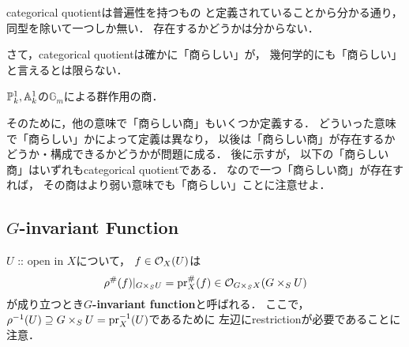\documentclass[a4paper]{jsarticle}
\newcommand{\Gm}{\mathbb{G}_m}
\begin{document}
    \begin{Remark}
        categorical quotientは普遍性を持つもの
        と定義されていることから分かる通り，
        同型を除いて一つしか無い．
        存在するかどうかは分からない．
    \end{Remark}

    さて，categorical quotientは確かに「商らしい」が，
    幾何学的にも「商らしい」と言えるとは限らない．

    \begin{Example}\label{example:P,A/Gm}
        $\mathbb{P}^1_k, \mathbb{A}^1_k$の$\Gm$による群作用の商．
    \end{Example}

    そのために，他の意味で「商らしい商」もいくつか定義する．
    どういった意味で「商らしい」かによって定義は異なり，
    以後は「商らしい商」が存在するかどうか・構成できるかどうかが問題に成る．
    後に示すが，
    以下の「商らしい商」はいずれもcategorical quotientである．
    なので一つ「商らしい商」が存在すれば，
    その商はより弱い意味でも「商らしい」ことに注意せよ．

    \subsection{$G$-invariant Function}
    \begin{Def}[\cite{AV}]
        $U$ :: open in $X$について，
        $f \in \mathcal{O}_X(U)$は
        \[ \rho^{\#}(f)|_{G \times_S U}=\operatorname{pr}_X^{\#}(f) \in \mathcal{O}_{G \times_S X}(G \times_S U) \]
        が成り立つとき\textbf{$G$-invariant function}と呼ばれる．
        ここで，
        $\rho^{-1}(U) \supseteq G \times_S U=\operatorname{pr}_X^{-1}(U)$であるために
        左辺にrestrictionが必要であることに注意．
    \end{Def}
\end{document}

